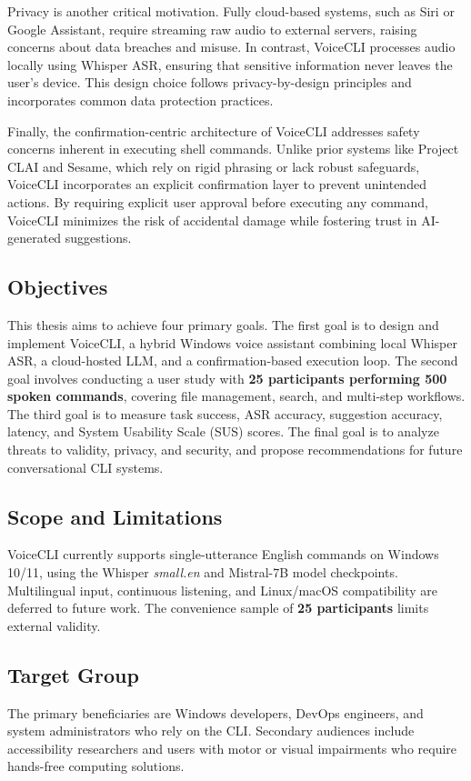 \documentclass[a4paper,12pt]{article}
\begin{document}
Privacy is another critical motivation. Fully cloud-based systems, such as Siri or Google Assistant, require streaming raw audio to external servers, raising concerns about data breaches and misuse. In contrast, VoiceCLI processes audio locally using Whisper ASR, ensuring that sensitive information never leaves the user's device. This design choice follows privacy-by-design principles and incorporates common data protection practices.

Finally, the confirmation-centric architecture of VoiceCLI addresses safety concerns inherent in executing shell commands. Unlike prior systems like Project CLAI and Sesame, which rely on rigid phrasing or lack robust safeguards, VoiceCLI incorporates an explicit confirmation layer to prevent unintended actions. By requiring explicit user approval before executing any command, VoiceCLI minimizes the risk of accidental damage while fostering trust in AI-generated suggestions.


 

\subsection{Objectives}
\noindent This thesis aims to achieve four primary goals. The first goal is to design and implement VoiceCLI, a hybrid Windows voice assistant combining local Whisper ASR, a cloud-hosted LLM, and a confirmation-based execution loop. The second goal involves conducting a user study with \textbf{25 participants performing 500 spoken commands}, covering file management, search, and multi-step workflows. The third goal is to measure task success, ASR accuracy, suggestion accuracy, latency, and System Usability Scale (SUS) scores. The final goal is to analyze threats to validity, privacy, and security, and propose recommendations for future conversational CLI systems.

\subsection{Scope and Limitations}
\noindent VoiceCLI currently supports single-utterance English commands on Windows 10/11, using the Whisper \textit{small.en} and Mistral-7B model checkpoints. Multilingual input, continuous listening, and Linux/macOS compatibility are deferred to future work. The convenience sample of \textbf{25 participants} limits external validity.

\subsection{Target Group}
\noindent The primary beneficiaries are Windows developers, DevOps engineers, and system administrators who rely on the CLI. Secondary audiences include accessibility researchers and users with motor or visual impairments who require hands-free computing solutions.
\end{document}
